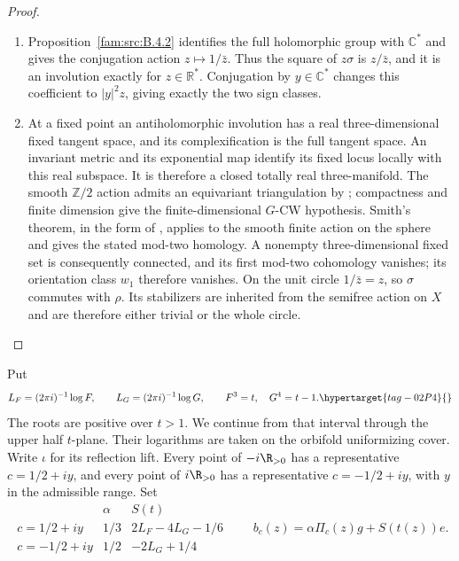 \begin{proof}
\begin{enumerate}[label=\arabic*.,leftmargin=*]
\item Proposition~\ref{fam:src:B.4.2} identifies the full holomorphic group
with $\mathbb C^*$ and gives the conjugation action $z\mapsto1/\bar z$.
Thus the square of $z\sigma$ is $z/\bar z$, and it is an involution
exactly for $z\in\mathbb R^*$. Conjugation by $y\in\mathbb C^*$ changes
this coefficient to $|y|^2z$, giving exactly the two sign classes.

\item At a fixed point an antiholomorphic involution has a real three-dimensional
fixed tangent space, and its complexification is the full tangent space.
An invariant metric and its exponential map identify its fixed locus
locally with this real subspace. It is therefore a closed totally real
three-manifold. The smooth $\mathbb Z/2$ action admits an equivariant
triangulation by \cite[Theorem~3.1, p.~48]{Illman1972}; compactness and finite
dimension give the finite-dimensional $G$-CW hypothesis. Smith's theorem,
in the form of
\cite[Theorem 4.1(1)]{Knudson2004}, applies to the smooth finite action on
the sphere and gives the stated mod-two homology. A nonempty
three-dimensional fixed set is consequently connected, and its first
mod-two cohomology vanishes; its orientation class $w_1$ therefore
vanishes. On the unit circle $1/\bar z=z$, so $\sigma$ commutes with
$\rho$. Its stabilizers are inherited from the semifree action on $X$ and are
therefore either trivial or the whole circle.
\end{enumerate}
\end{proof}

\begin{definition}\hypertarget{tag-IP05}{}\label{I:def:real-representatives}
Put
\[
 L_F=(2\pi i)^{-1}\log F,\qquad L_G=(2\pi i)^{-1}\log G,
 \qquad F^3=t,\quad G^4=t-1.
 \hypertarget{tag-02P4}{}\label{mapsI:real-eq-1}
\]
The roots are positive over $t>1$. We continue from that interval
through the upper half $t$-plane. Their logarithms are taken on the
orbifold uniformizing cover. Write $\iota$ for its reflection lift.
Every point of $-i\R_{>0}$ has a representative $c=1/2+iy$, and every
point of $i\R_{>0}$ has a representative $c=-1/2+iy$, with $y$ in the
admissible range. Set
\[
\begin{array}{c|c|c}
 &\alpha&S(t)\\\hline
 c=1/2+iy&1/3&2L_F-4L_G-1/6\\
 c=-1/2+iy&1/2&-2L_G+1/4
\end{array}
\qquad b_c(z)=\alpha\Pi_c(z)g+S(t(z))e.
\label{mapsI:real-eq-2}
\]
\end{definition}

